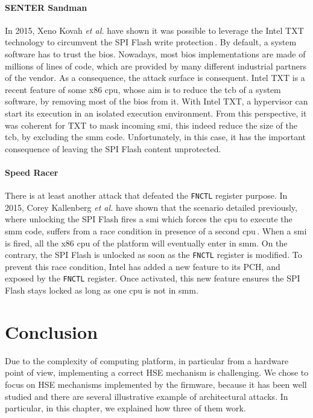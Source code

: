 \paragraph{SENTER Sandman}
%
In 2015, Xeno Kovah \emph{et al.} have shown it was possible to leverage the
Intel TXT technology to circumvent the SPI Flash write
protection\,\cite{kovah2015senter}.
%
By default, a system software has to trust the \ac{bios}.
%
Nowadays, most \ac{bios} implementations are made of millions of lines of code,
which are provided by many different industrial partners of the vendor.
%
As a consequence, the attack surface is consequent.
%
Intel TXT is a recent feature of some x86 \ac{cpu}, whose aim is to reduce the
\ac{tcb} of a system software, by removing most of the \ac{bios} from it.
%
With Intel TXT, a hypervisor can start its execution in an isolated execution
environment.
%
From this perspective, it was coherent for TXT to mask incoming \ac{smi}, this
indeed reduce the size of the \ac{tcb}, by excluding the \ac{smm} code.
%
Unfortunately, in this case, it has the important consequence of leaving the SPI
Flash content unprotected.

\paragraph{Speed Racer}
%
There is at least another attack that defeated the \texttt{FNCTL} register
purpose.
%
In 2015, Corey Kallenberg \emph{et al.} have shown that the scenario detailed
previously, where unlocking the SPI Flash fires a \ac{smi} which forces the
\ac{cpu} to execute the \ac{smm} code, suffers from a race condition in presence
of a second \ac{cpu}\,\cite{kallenberg2015racecondition}.
%
When a \ac{smi} is fired, all the x86 \ac{cpu} of the platform will eventually
enter in \ac{smm}.
%
On the contrary, the SPI Flash is unlocked as soon as the \texttt{FNCTL}
register is modified.
%
To prevent this race condition, Intel has added a new feature to its PCH, and
exposed by the \texttt{FNCTL} register.
%
Once activated, this new feature ensures the SPI Flash stays locked as long as
one \ac{cpu} is not in \ac{smm}.

\section{Conclusion}
\label{sec:usecase:conclusion}

Due to the complexity of computing platform, in particular from a hardware point
of view, implementing a correct HSE mechanism is challenging.
%
We chose to focus on HSE mechanisms implemented by the firmware, because it has
been well studied and there are several illustrative example of architectural
attacks.
%
In particular, in this chapter, we explained how three of them work.
